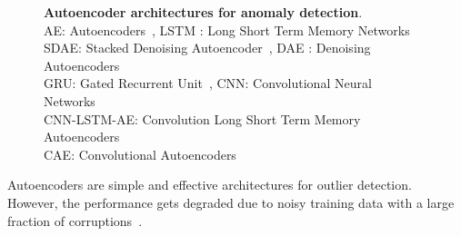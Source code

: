 
\begin{figure}
\centering
{}
\caption{\textbf{Autoencoder architectures for anomaly detection}.
        \\AE: Autoencoders~\cite{liou2014autoencoder}, LSTM : Long Short Term Memory Networks~\cite{hochreiter1997long}
        \\SDAE: Stacked Denoising Autoencoder~\cite{vincent2010stacked}, DAE : Denoising Autoencoders~\cite{vincent2010stacked}
        \\GRU: Gated Recurrent Unit~\cite{cho2014learning}, CNN: Convolutional Neural Networks~\cite{krizhevsky2012imagenet}
        \\CNN-LSTM-AE: Convolution Long Short Term Memory Autoencoders~\cite{haque2018image}
        \\CAE: Convolutional Autoencoders~\cite{masci2011stacked}
        }

 \label{fig:aevariants}
\end{figure}
Autoencoders are simple and effective architectures for outlier detection. However, the performance gets degraded  due to noisy training data with a large fraction of corruptions~\cite{zhou2017anomaly}.

